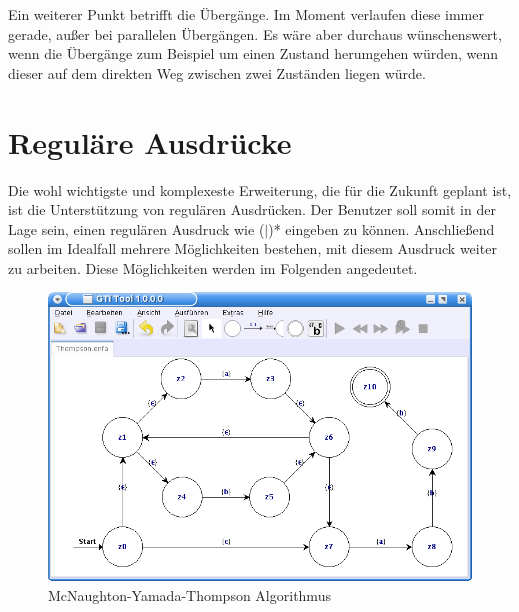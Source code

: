 Ein weiterer Punkt betrifft die Übergänge. Im Moment verlaufen diese immer
gerade, außer bei parallelen Übergängen. Es wäre aber durchaus wünschenswert,
wenn die Übergänge zum Beispiel um einen Zustand herumgehen würden, wenn dieser
auf dem direkten Weg zwischen zwei Zuständen liegen würde.\vspace{10pt}


\section{Reguläre Ausdrücke}\label{PerspectiveRegEx}

Die wohl wichtigste und komplexeste Erweiterung, die für die Zukunft geplant ist,
ist die Unterstützung von regulären Ausdrücken. Der Benutzer soll somit in der
Lage sein, einen regulären Ausdruck wie
($\mid$)* eingeben zu können.
Anschließend sollen im Idealfall mehrere Möglichkeiten bestehen, mit diesem
Ausdruck weiter zu arbeiten. Diese Möglichkeiten werden im Folgenden
angedeutet.\vspace{10pt}

\begin{figure}[h!]
\begin{center}
\includegraphics[width=12cm]{../images/thompson.png}
\caption{McNaughton-Yamada-Thompson Algorithmus}
\label{FigureThompson}
\end{center}
\end{figure}
\vspace{10pt}

